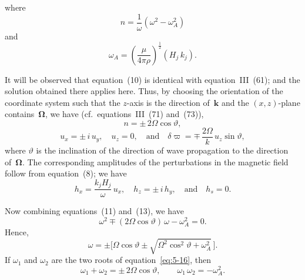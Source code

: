 
\noindent
where
\begin{equation}
  n = \frac{1}{\omega}(\omega^{2}-\omega_{A}^{2})
  \label{eq:5-11}
\end{equation}
and
\begin{equation}
  \omega_{A} = \left(\frac{\mu}{4\pi\rho}\right)^{\!\frac{1}{2}}
  (H_{j}\,k_{j}).
  \label{eq:5-12}
\end{equation}

It will be observed that equation~(10) is identical with equation~III~(61);
and the solution obtained there applies here.  Thus, by choosing the
orientation of the coordinate system such that the $z$-axis is the direction
of~$\mathbf{k}$ and the $(x,z)$-plane contains~$\boldsymbol{\Omega}$, we have
(cf.\ equations~III~(71) and~(73)),
\begin{equation}
  n = \pm\,2\Omega\cos\vartheta,
  \label{eq:5-13}
\end{equation}
\begin{equation}
  u_{x} = \pm\,i\,u_{y},\quad
  u_{z} = 0,\quad\text{and}\quad
  \delta\varpi = \mp\,\frac{2\Omega}{k}\,u_{z}\sin\vartheta,
  \label{eq:5-14}
\end{equation}
where $\vartheta$ is the inclination of the direction of wave propagation to
the direction of~$\boldsymbol{\Omega}$.  The corresponding amplitudes of the
perturbations in the magnetic field follow from equation~(8); we have
\begin{equation}
  h_{x} = \frac{k_{j}H_{j}}{\omega}\,u_{x},\quad
  h_{z} = \pm\,i\,h_{y},\quad\text{and}\quad
  h_{s} = 0.
  \label{eq:5-15}
\end{equation}

Now combining equations~(11) and~(13), we have
\begin{equation}
  \omega^{2} \mp (2\Omega\cos\vartheta)\,\omega - \omega_{A}^{2} = 0.
  \label{eq:5-16}
\end{equation}
Hence,
\begin{equation}
  \omega = \pm\bigl[\Omega\cos\vartheta
    \pm\sqrt{\Omega^{2}\cos^{2}\!\vartheta+\omega_{A}^{2}}\,\bigr].
  \label{eq:5-17}
\end{equation}
If $\omega_{1}$ and $\omega_{2}$ are the two roots of equation~\eqref{eq:5-16},
then
\begin{equation}
  \omega_{1}+\omega_{2} = \pm\,2\Omega\cos\vartheta,\qquad
  \omega_{1}\,\omega_{2} = -\omega_{A}^{2}.
  \label{eq:5-18}
\end{equation}

